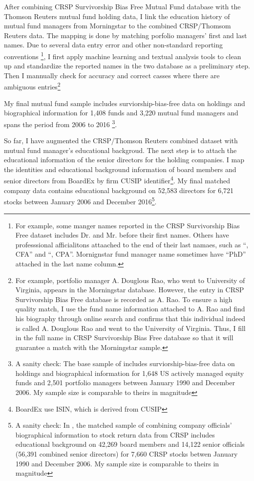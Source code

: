 \documentclass[11pt]{article}
\begin{document}
\begin{doublespace}
After combining CRSP Survivorship Bias Free Mutual Fund database with the Thomson Reuters mutual fund holding data, I link the education history of mutual fund managers from Morningstar to the combined CRSP/Thomsom Reuters data. The mapping is done by matching porfolio managers' first and last names. Due to several data entry error and other non-standard reporting conventions \footnote{For example, some manger names reported in the CRSP Survivorship Bias Free dataset includes Dr. and Mr. before their first names. Others have professsional afficialitons attaached to the end of their last namaes, such as ``, CFA'' and ``, CPA''. Mornignstar fund manager name sometimes have ``PhD'' attached in the last name column.}, I first apply machine learning and textual analysis tools to clean up and standardize the reported names in the two database as a preliminary step. Then I mannually check for accuracy and correct casses where there are ambiguous entries\footnote{For example, portfolio manager A. Douglous Rao, who went to University of Virginia, appears in the Morningstar database. However, the entry in CRSP Survivorship Bias Free database is recorded as A. Rao. To ensure a high quality match, I use the fund name information attached to A. Rao and find his biography through online search and confirms that this individual indeed is called A. Douglous Rao and went to the University of Virginia. Thus, I fill in the full name in CRSP Survivorship Bias Free database so that it will guarantee a match with the Morningstar sample.}

 My final mutual fund sample includes surviorship-bias-free data on holdings and biographical information for 1,408 funds and 3,220 mutual fund managers and spans the period from 2006 to 2016 \footnote{A sanity check: The base sample of \cite{cohen2008small} includes surviorship-bias-free data on holdings and biographical information for 1,648 US actively managed equity funds and 2,501 portfolio managers between January 1990 and December 2006. My sample size is comparable to theirs in magnitude}.

So far, I have augmented the CRSP/Thomson Reuters combined dataset with mutual fund manager's educational backgroud. The next step is to attach the educational information of the senior directors for the holding companies. I map the identities and educational background information of board members and senior directors from BoardEx by firm CUSIP identifier\footnote{BoardEx use ISIN, which is derived from CUSIP}. My final matched company data contains educational background on 52,583 directors for 6,721 stocks between January 2006 and December 2016\footnote{A sanity check: In \cite{cohen2008small}, the matched sample of combining company officials' biographical information to stock return data from CRSP includes educational background on 42,269 board members and 14,122 senior officials (56,391 combined senior directors) for 7,660 CRSP stocks betwen January 1990 and December 2006. My sample size is comparable to theirs in magnitude}.


\end{doublespace}
\end{document}
